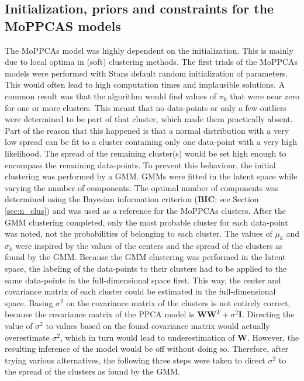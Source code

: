 \subsection{Initialization, priors and constraints for the MoPPCAS models}\label{sec:prios}
The MoPPCAs model was highly dependent on the initialization. This is mainly due to local optima in (soft) clustering methods. The first trials of the MoPPCAs models were performed with Stans default random initialization of parameters. This would often lead to high computation times and implausible solutions. A common result was that the algorithm would find values of $\pi_k$ that were near zero for one or more clusters. This meant that no data-points or only a few outliers were determined to be part of that cluster, which made them practically absent. Part of the reason that this happened is that a normal distribution with a very low spread can be fit to a cluster containing only one data-point with a very high likelihood. The spread of the remaining cluster(s) would be set high enough to encompass the remaining data-points. To prevent this behaviour, the initial clustering was performed by a GMM. GMMs were fitted in the latent space while varying the number of components. The optimal number of components was determined using the Bayesian information criterion (\textbf{BIC}; see Section \ref{sec:n_clus}) and was used as a reference for the MoPPCAs clusters. After the GMM clustering completed, only the most probable cluster for each data-point was noted, not the probabilities of belonging to each cluster. The values of $\mu_k$ and $\sigma_k$ were inspired by the values of the centers and the spread of the clusters as found by the GMM. Because the GMM clustering was performed in the latent space, the labeling of the data-points to their clusters had to be applied to the same data-points in the full-dimensional space first. This way, the center and covariance matrix of each cluster could be estimated in the full-dimensional space. Basing $\sigma^2$ on the covariance matrix of the clusters is not entirely correct, because the covariance matrix of the PPCA model is $\bm{W}\bm{W}^T + \sigma^2 \bm{I}$. Directing the value of $\sigma^2$ to values based on the found covariance matrix would actually overestimate $\sigma^2$, which in turn would lead to underestimation of $\bm{W}$. However, the resulting inference of the model would be off without doing so. Therefore, after trying various alternatives, the following three steps were taken to direct $\sigma^2$ to the spread of the clusters as found by the GMM.

